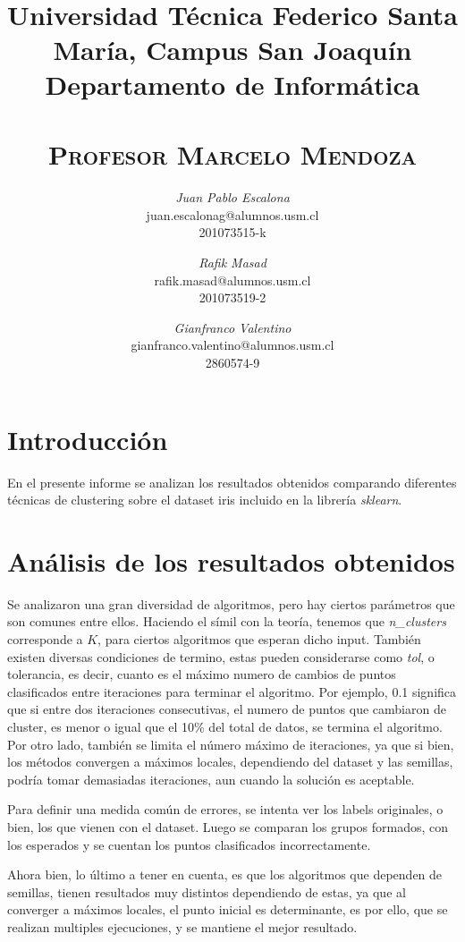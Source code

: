 \documentclass{article}
\title{
  \Large\textmd{\textbf{\tareaRamo\\ \tareaTitulo}}\\
  \vspace{0.1in}
  \normalsize
  Universidad Técnica Federico Santa María, Campus San Joaquín\\
  Departamento de Informática\\
  \vspace{0.1in}
  \small{\textsc{\tareaFecha}}\\
  \vspace{0.1in}
  \large{\textsc{Profesor Marcelo Mendoza}}
  \vspace{1.5in}
}
\author{
    \textit{Juan Pablo Escalona} \\
    \small{juan.escalonag@alumnos.usm.cl} \\
    \small{201073515-k}
    \and
    \textit{Rafik Masad} \\
    \small{rafik.masad@alumnos.usm.cl} \\
    \small{201073519-2}
    \and
    \textit{Gianfranco Valentino}\\
    \small{gianfranco.valentino@alumnos.usm.cl}\\
    \small{2860574-9}
}
\date{}
\begin{document}
\maketitle
\newpage


\section*{Introducción}

En el presente informe se analizan los resultados obtenidos comparando diferentes técnicas de clustering sobre el dataset iris incluido en la librería \textit{sklearn}.

\section*{Análisis de los resultados obtenidos}
Se analizaron una gran diversidad de algoritmos, pero hay ciertos parámetros que son comunes entre ellos. Haciendo el símil con la teoría, tenemos que \emph{n\_clusters} corresponde a $K$, para ciertos
algoritmos que esperan dicho input. También existen diversas condiciones de termino, estas pueden considerarse como \emph{tol}, o tolerancia, es decir, cuanto es el máximo numero de cambios de puntos clasificados entre iteraciones
para terminar el algoritmo. Por ejemplo, 0.1 significa que si entre dos iteraciones consecutivas, el numero de puntos que cambiaron de cluster, es menor o igual que el 10\% del total de datos, se termina el algoritmo. Por otro lado, también
se limita el número máximo de iteraciones, ya que si bien, los métodos convergen a máximos locales, dependiendo del dataset y las semillas, podría tomar demasiadas iteraciones, aun cuando la solución es aceptable.

Para definir una medida común de errores, se intenta ver los labels originales, o bien, los que vienen con el dataset. Luego se comparan los grupos formados, con los esperados y se cuentan los puntos clasificados incorrectamente.

Ahora bien, lo último a tener en cuenta, es que los algoritmos que dependen de semillas, tienen resultados muy distintos dependiendo de estas, ya que al converger a máximos locales, el punto inicial es determinante, es por ello, que se realizan
multiples ejecuciones, y se mantiene el mejor resultado.
\end{document}

